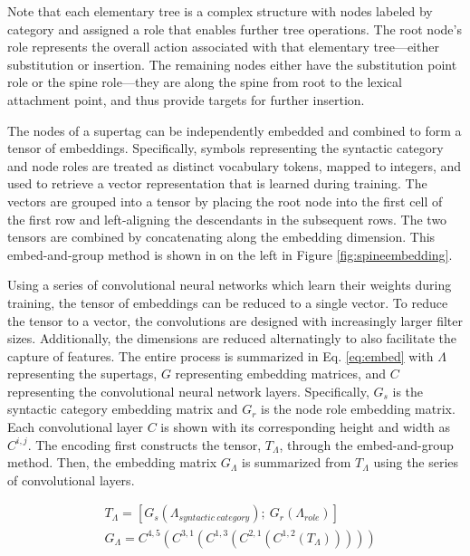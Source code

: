 \documentclass[11pt]{article}
\begin{document}
Note that each elementary tree is a complex structure with nodes
labeled by category and assigned a role that enables further tree
operations.
%
The root node's role represents the overall action associated with
that elementary tree---either substitution or insertion.
%
The remaining nodes either have the substitution point role or the
spine role---they are along the spine from root to the lexical
attachment point, and thus provide targets for further insertion.

The nodes of a supertag can be independently embedded and combined to form a
tensor of embeddings.
%
Specifically, symbols representing the syntactic category and node roles are treated as
distinct vocabulary tokens, mapped to integers, and used to retrieve a vector
representation that is learned during training.
%
The vectors are grouped into a tensor by placing the root node into the
first cell of the first row and left-aligning the descendants in the subsequent rows.
%
The two tensors are combined by concatenating along the embedding dimension.
%
This embed-and-group method is shown in on the left in Figure \ref{fig:spineembedding}.


Using a series of convolutional neural networks which learn their weights during training, the tensor of embeddings can be reduced to a single vector.
%
To reduce the tensor to a vector, the convolutions are designed with increasingly larger filter sizes.
%
Additionally, the dimensions are reduced alternatingly to also facilitate the capture of features.
%
The entire process is summarized in Eq. \ref{eq:embed} with $\Lambda$ representing the supertags, $G$ representing embedding matrices, and
$C$ representing the convolutional neural network layers.
%
Specifically, $G_s$ is the syntactic category embedding matrix and
$G_r$ is the node role embedding matrix.
%
Each convolutional layer $C$ is shown with its corresponding height and width as $C^{i,j}$.
%
The encoding first constructs the tensor, $T_\Lambda$, through the embed-and-group method.
%
Then, the embedding matrix $G_\Lambda$ is summarized from $T_\Lambda$ using the
series of convolutional layers.

\begin{align}
& T_\Lambda = [G_s(\Lambda_{syntactic~category});~G_r(\Lambda_{role})] \nonumber \\
& G_\Lambda = C^{4,5}(C^{3,1}(C^{1,3}(C^{2,1}(C^{1,2}(T_\Lambda))))) \label{eq:embed}
\end{align}
\end{document}
